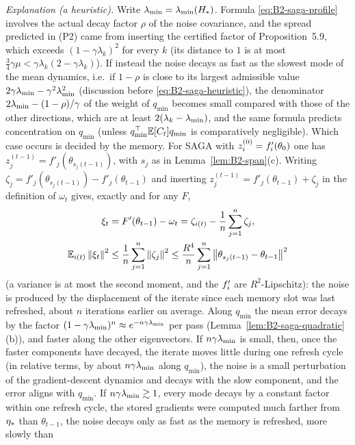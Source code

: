 \begin{remark}
\emph{Explanation (a heuristic).} Write $\lambda_{\min}=\lambda_{\min}(H_\ast)$. Formula \eqref{eq:B2-saga-profile} involves the actual decay
factor $\rho$ of the noise covariance, and the spread predicted in (P2) came from inserting the certified factor of
Proposition~5.9, which exceeds $(1-\gamma\lambda_k)^2$ for every $k$ (its distance to $1$ is at most
$\frac34\gamma\mu<\gamma\lambda_k(2-\gamma\lambda_k)$). If instead the noise decays as fast as the slowest mode of the
mean dynamics, i.e.\ if $1-\rho$ is close to its largest admissible value $2\gamma\lambda_{\min}-\gamma^2\lambda_{\min}^2$ (discussion before
\eqref{eq:B2-saga-heuristic}), the denominator $2\lambda_{\min}-(1-\rho)/\gamma$ of the weight of $q_{\min}$ becomes small compared
with those of the other directions, which are at least $2(\lambda_k-\lambda_{\min})$, and the same formula predicts concentration on
$q_{\min}$ (unless $q_{\min}^\top\mathbb{E}[C_t]q_{\min}$ is comparatively negligible). Which case occurs is decided by the memory.
For SAGA with $z_i^{(0)}=f'_i(\theta_0)$ one has $z_j^{(t-1)}=f'_j(\theta_{s_j(t-1)})$, with $s_j$ as in
Lemma~\ref{lem:B2-span}(c). Writing $\zeta_j=f'_j(\theta_{s_j(t-1)})-f'_j(\theta_{t-1})$ and inserting
$z_j^{(t-1)}=f'_j(\theta_{t-1})+\zeta_j$ in the definition of $\omega_t$ gives, exactly and for any $F$,
\begin{align*}
\xi_t&=F'(\theta_{t-1})-\omega_t=\zeta_{i(t)}-\frac1n\sum_{j=1}^n\zeta_j,\\
\mathbb{E}_{i(t)}\left\|\xi_t\right\|^2&\le\frac1n\sum_{j=1}^n\left\|\zeta_j\right\|^2\le\frac{R^4}n\sum_{j=1}^n\left\|\theta_{s_j(t-1)}-\theta_{t-1}\right\|^2
\end{align*}
(a variance is at most the second moment, and the $f'_i$ are $R^2$-Lipschitz): the noise is produced by the displacement of
the iterate since each memory slot was last refreshed, about $n$ iterations earlier on average. Along $q_{\min}$ the mean
error decays by the factor $(1-\gamma\lambda_{\min})^n\approx e^{-n\gamma\lambda_{\min}}$ per pass (Lemma~\ref{lem:B2-saga-quadratic}(b)), and
faster along the other eigenvectors. If $n\gamma\lambda_{\min}$ is small, then, once the faster components have decayed, the iterate
moves little during one refresh cycle (in relative terms, by about $n\gamma\lambda_{\min}$ along $q_{\min}$), the noise is a small
perturbation of the gradient-descent dynamics and decays with the slow component, and the error aligns with $q_{\min}$. If
$n\gamma\lambda_{\min}\gtrsim1$, every mode decays by a constant factor within one refresh cycle, the stored gradients were computed
much farther from $\eta_\ast$ than $\theta_{t-1}$, the noise decays only as fast as the memory is refreshed, more slowly than

\end{remark}
